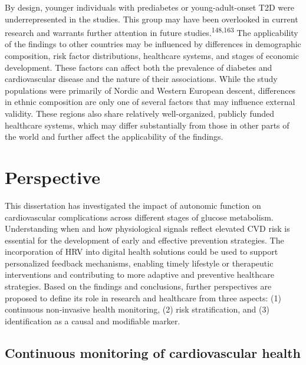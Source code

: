 \documentclass[
  letterpaper,
  headsepline=true,
  open=any]{scrbook}
\begin{document}
By design, younger individuals with prediabetes or young-adult-onset T2D
were underrepresented in the studies. This group may have been
overlooked in current research and warrants further attention in future
studies.\textsuperscript{148,163} The applicability of the findings to
other countries may be influenced by differences in demographic
composition, risk factor distributions, healthcare systems, and stages
of economic development. These factors can affect both the prevalence of
diabetes and cardiovascular disease and the nature of their
associations. While the study populations were primarily of Nordic and
Western European descent, differences in ethnic composition are only one
of several factors that may influence external validity. These regions
also share relatively well-organized, publicly funded healthcare
systems, which may differ substantially from those in other parts of the
world and further affect the applicability of the findings.


\hypertarget{perspective}{%
\chapter{Perspective}\label{perspective}}

\newpage

This dissertation has investigated the impact of autonomic function on
cardiovascular complications across different stages of glucose
metabolism. Understanding when and how physiological signals reflect
elevated CVD risk is essential for the development of early and
effective prevention strategies. The incorporation of HRV into digital
health solutions could be used to support personalized feedback
mechanisms, enabling timely lifestyle or therapeutic interventions and
contributing to more adaptive and preventive healthcare strategies.
Based on the findings and conclusions, further perspectives are proposed
to define its role in research and healthcare from three aspects: (1)
continuous non-invasive health monitoring, (2) risk stratification, and
(3) identification as a causal and modifiable marker.

\hypertarget{continuous-monitoring-of-cardiovascular-health}{%
\section{Continuous monitoring of cardiovascular
health}\label{continuous-monitoring-of-cardiovascular-health}}
\end{document}
